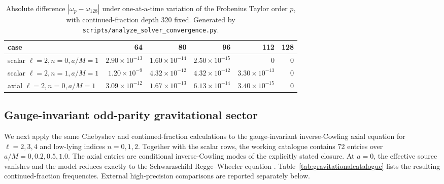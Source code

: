 \documentclass[12pt,a4paper]{article}
\begin{document}
\begin{table}[H]
\centering
\footnotesize
\begin{tabular}{lrrrrr}
\toprule
case & 64 & 80 & 96 & 112 & 128\\
\midrule
scalar \(\ell=2,n=0,a/M=1\) & \(2.90\times10^{-13}\) & \(1.60\times10^{-14}\) & \(2.50\times10^{-15}\) & 0 & 0\\
scalar \(\ell=2,n=1,a/M=1\) & \(1.20\times10^{-9}\) & \(4.32\times10^{-12}\) & \(4.32\times10^{-12}\) & \(3.30\times10^{-13}\) & 0\\
axial \(\ell=2,n=0,a/M=1\) & \(3.09\times10^{-12}\) & \(1.67\times10^{-13}\) & \(6.13\times10^{-14}\) & \(3.40\times10^{-15}\) & 0\\
\bottomrule
\end{tabular}
\caption{Absolute difference \(|\omega_p-\omega_{128}|\) under one-at-a-time
variation of the Frobenius Taylor order \(p\), with continued-fraction depth
320 fixed.  Generated by
\texttt{scripts/analyze\_solver\_convergence.py}.}
\label{tab:taylorconvergence}
\end{table}

\subsection{Gauge-invariant odd-parity gravitational sector}

We next apply the same Chebyshev and continued-fraction calculations to the
gauge-invariant inverse-Cowling axial equation for \(\ell=2,3,4\) and low-lying
indices \(n=0,1,2\).  Together with the scalar rows, the working catalogue
contains 72 entries over \(a/M=0,0.2,0.5,1.0\).  The axial entries are
conditional inverse-Cowling modes of the explicitly stated closure. At
\(a=0\), the effective source vanishes and the
model reduces exactly to the Schwarzschild Regge--Wheeler equation
\cite{Regge1957,Gerlach1979,Karlovini2002}.
Table~\ref{tab:gravitationalcatalogue} lists the resulting continued-fraction
frequencies.  External high-precision comparisons are reported separately
below.
\end{document}
